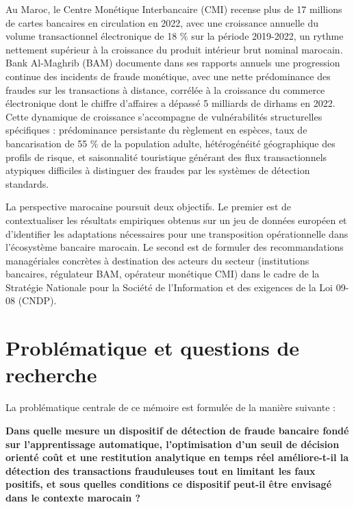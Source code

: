 Au Maroc, le Centre Monétique Interbancaire (CMI) recense plus de 17 millions de cartes bancaires en circulation en 2022, avec une croissance annuelle du volume transactionnel électronique de 18 \% sur la période 2019-2022, un rythme nettement supérieur à la croissance du produit intérieur brut nominal marocain. Bank Al-Maghrib (BAM) documente dans ses rapports annuels une progression continue des incidents de fraude monétique, avec une nette prédominance des fraudes sur les transactions à distance, corrélée à la croissance du commerce électronique dont le chiffre d'affaires a dépassé 5 milliards de dirhams en 2022. Cette dynamique de croissance s'accompagne de vulnérabilités structurelles spécifiques : prédominance persistante du règlement en espèces, taux de bancarisation de 55 \% de la population adulte, hétérogénéité géographique des profils de risque, et saisonnalité touristique générant des flux transactionnels atypiques difficiles à distinguer des fraudes par les systèmes de détection standards.

La perspective marocaine poursuit deux objectifs. Le premier est de contextualiser les résultats empiriques obtenus sur un jeu de données européen et d'identifier les adaptations nécessaires pour une transposition opérationnelle dans l'écosystème bancaire marocain. Le second est de formuler des recommandations managériales concrètes à destination des acteurs du secteur (institutions bancaires, régulateur BAM, opérateur monétique CMI) dans le cadre de la Stratégie Nationale pour la Société de l'Information et des exigences de la Loi 09-08 (CNDP).

\section*{Problématique et questions de recherche}

La problématique centrale de ce mémoire est formulée de la manière suivante :

\textbf{Dans quelle mesure un dispositif de détection de fraude bancaire fondé sur l'apprentissage automatique, l'optimisation d'un seuil de décision orienté coût et une restitution analytique en temps réel améliore-t-il la détection des transactions frauduleuses tout en limitant les faux positifs, et sous quelles conditions ce dispositif peut-il être envisagé dans le contexte marocain ?}


